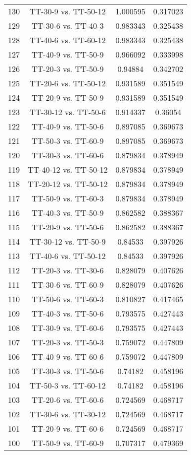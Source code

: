 \documentclass[a4paper,10pt]{article}
\begin{document}
\begin{landscape}
\begin{table}[!htp]
\begin{tabular}{cccc}
130&TT-30-9 vs. TT-50-12&1.000595&0.317023\\
129&TT-30-6 vs. TT-40-3&0.983343&0.325438\\
128&TT-40-6 vs. TT-60-12&0.983343&0.325438\\
127&TT-40-9 vs. TT-50-9&0.966092&0.333998\\
126&TT-20-3 vs. TT-50-9&0.94884&0.342702\\
125&TT-20-6 vs. TT-50-12&0.931589&0.351549\\
124&TT-20-9 vs. TT-50-9&0.931589&0.351549\\
123&TT-30-12 vs. TT-50-6&0.914337&0.36054\\
122&TT-40-9 vs. TT-50-6&0.897085&0.369673\\
121&TT-50-3 vs. TT-60-9&0.897085&0.369673\\
120&TT-30-3 vs. TT-60-6&0.879834&0.378949\\
119&TT-40-12 vs. TT-50-12&0.879834&0.378949\\
118&TT-20-12 vs. TT-50-12&0.879834&0.378949\\
117&TT-50-9 vs. TT-60-3&0.879834&0.378949\\
116&TT-40-3 vs. TT-50-9&0.862582&0.388367\\
115&TT-20-9 vs. TT-50-6&0.862582&0.388367\\
114&TT-30-12 vs. TT-50-9&0.84533&0.397926\\
113&TT-40-6 vs. TT-50-12&0.84533&0.397926\\
112&TT-20-3 vs. TT-30-6&0.828079&0.407626\\
111&TT-30-6 vs. TT-60-9&0.828079&0.407626\\
110&TT-50-6 vs. TT-60-3&0.810827&0.417465\\
109&TT-40-3 vs. TT-50-6&0.793575&0.427443\\
108&TT-30-9 vs. TT-60-6&0.793575&0.427443\\
107&TT-20-3 vs. TT-50-3&0.759072&0.447809\\
106&TT-40-9 vs. TT-60-6&0.759072&0.447809\\
105&TT-30-3 vs. TT-50-6&0.74182&0.458196\\
104&TT-50-3 vs. TT-60-12&0.74182&0.458196\\
103&TT-20-6 vs. TT-60-6&0.724569&0.468717\\
102&TT-30-6 vs. TT-30-12&0.724569&0.468717\\
101&TT-20-9 vs. TT-60-6&0.724569&0.468717\\
100&TT-50-9 vs. TT-60-9&0.707317&0.479369\\

\end{tabular}
\end{table}
\end{landscape}
\end{document}

